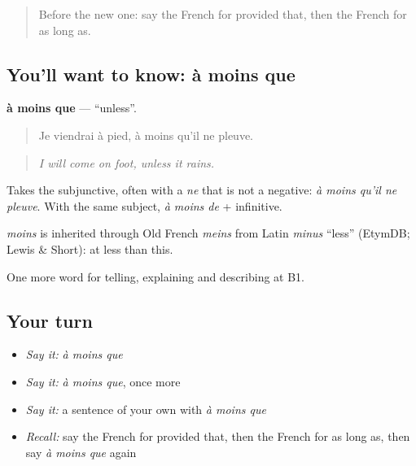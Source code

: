 \label{lesson:FR-C368-a-moins-que}



\begin{quote}
Before the new one: say the French for provided that, then the French for as long as.
\end{quote}

\subsection*{You'll want to know: à moins que}
\textbf{à moins que} — \textquotedblleft{}unless\textquotedblright{}.

\begin{quote}
Je viendrai à pied, à moins qu'il ne pleuve.
\end{quote}

\begin{quote}
\emph{I will come on foot, unless it rains.}
\end{quote}

Takes the subjunctive, often with a \emph{ne} that is not a negative: \emph{à moins qu'il ne pleuve}. With the same subject, \emph{à moins de} + infinitive.

\begin{cousinweb}
\emph{moins} is inherited through Old French \emph{meins} from Latin \emph{minus} \textquotedblleft{}less\textquotedblright{} (EtymDB; Lewis \& Short): at less than this.
\end{cousinweb}

\begin{grammarlens}[title={What you've built}]
One more word for telling, explaining and describing at B1.
\end{grammarlens}

\subsection*{Your turn}
\begin{itemize}
\raggedright
  \item \emph{Say it:} \emph{à moins que}
  \item \emph{Say it:} \emph{à moins que}, once more
  \item \emph{Say it:} a sentence of your own with \emph{à moins que}
  \item \emph{Recall:} say the French for provided that, then the French for as long as, then say \emph{à moins que} again
\end{itemize}

